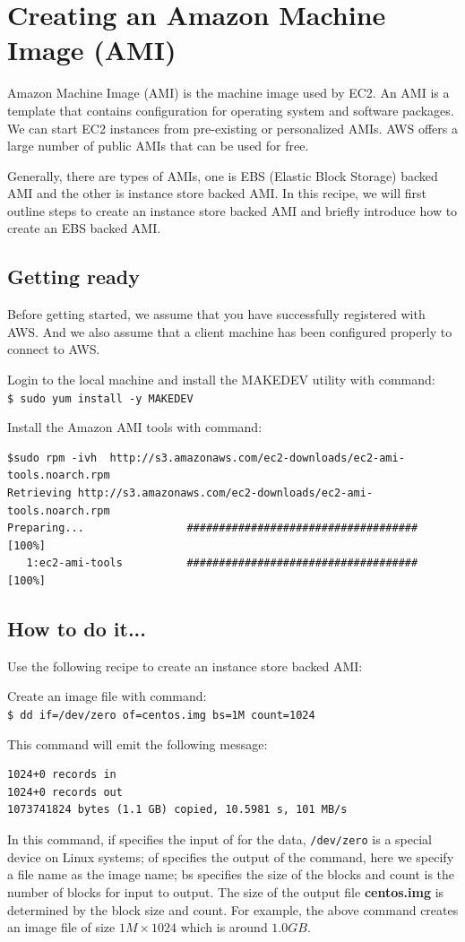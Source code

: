 \section{Creating an Amazon Machine Image (AMI)}
Amazon Machine Image (AMI) is the machine image used by EC2. An AMI is a template that contains configuration for operating system and software packages. We can start EC2 instances from pre-existing or personalized AMIs. AWS offers a large number of public AMIs that can be used for free.

Generally, there are types of AMIs, one is EBS (Elastic Block Storage) backed AMI and the other is instance store backed AMI. In this recipe, we will first outline steps to create an instance store backed AMI and briefly introduce how to create an EBS backed AMI.
\subsection*{Getting ready}
Before getting started, we assume that you have successfully registered with AWS. And we also assume that a client machine has been configured properly to connect to AWS.

Login to the local machine and install the MAKEDEV utility with command: \\
\verb|$ sudo yum install -y MAKEDEV|

Install the Amazon AMI tools with command:
\lstset{style=bashstyle}
\begin{lstlisting}
$sudo rpm -ivh  http://s3.amazonaws.com/ec2-downloads/ec2-ami-tools.noarch.rpm
Retrieving http://s3.amazonaws.com/ec2-downloads/ec2-ami-tools.noarch.rpm
Preparing...                #################################### [100%]
   1:ec2-ami-tools          #################################### [100%]
\end{lstlisting}

\subsection*{How to do it...}
Use the following recipe to create an instance store backed AMI:

Create an image file with command: \\
\verb|$ dd if=/dev/zero of=centos.img bs=1M count=1024|

This command will emit the following message:
\lstset{style=bashstyle}
\begin{lstlisting}
1024+0 records in
1024+0 records out
1073741824 bytes (1.1 GB) copied, 10.5981 s, 101 MB/s
\end{lstlisting}
In this command, if specifies the input of for the data, \verb|/dev/zero| is a special device on Linux systems; of specifies the output of the command, here we specify a file name as the image name; bs specifies the size of the blocks and count is the number of blocks for input to output. The size of the output file \textbf{centos.img} is determined by the block size and count. For example, the above command creates an image file of size $1M \times 1024$ which is around $1.0GB$.

